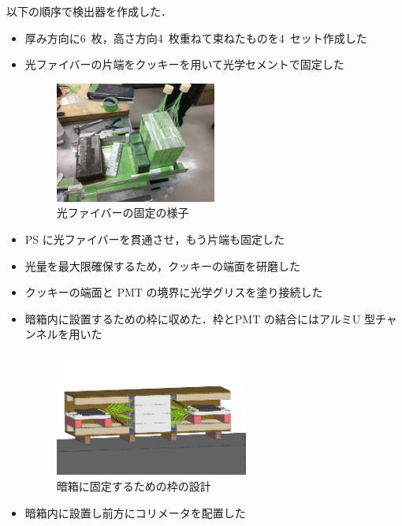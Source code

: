 以下の順序で検出器を作成した．
\begin{itemize}
\item 厚み方向に6~枚，高さ方向4~枚重ねて束ねたものを4~セット作成した
\item 光ファイバーの片端をクッキーを用いて光学セメントで固定した
\begin{figure}[H]
\centering
\includegraphics[width=0.5\textwidth]{figure/hayakawa/ps_kotei.jpg}
\caption{光ファイバーの固定の様子}
\end{figure}
\item PS に光ファイバーを貫通させ，もう片端も固定した
\item 光量を最大限確保するため，クッキーの端面を研磨した
\item クッキーの端面と PMT の境界に光学グリスを塗り接続した
\item 暗箱内に設置するための枠に収めた．枠とPMT の結合にはアルミU 型チャンネルを用いた
\begin{figure}[H]
\centering
\includegraphics[width=0.6\textwidth]{figure/hayakawa/waku1.png}
\caption{暗箱に固定するための枠の設計}
\end{figure}
\item 暗箱内に設置し前方にコリメータを配置した
\end{itemize}

